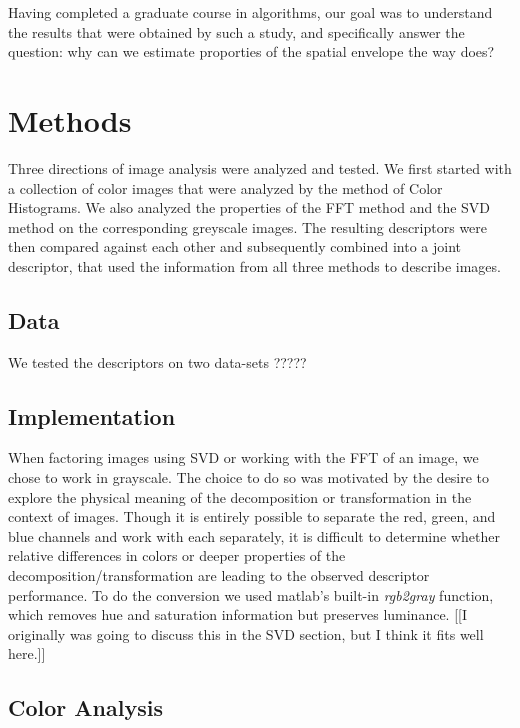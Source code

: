 \documentclass{report}
\begin{document}
Having completed a graduate course in algorithms, our goal was to understand the results that were obtained by such a study, and specifically answer the question: why can we estimate proporties of the spatial envelope the way \cite{gist_descriptor} does? 


\chapter{Methods}
Three directions of image analysis were analyzed and tested. We first started with a collection of color images that were analyzed by the method of Color Histograms. We also analyzed the properties of the FFT method and the SVD method on the corresponding greyscale images. The resulting descriptors were then compared against each other and subsequently combined into a joint descriptor, that used the information from all three methods to describe images.

\section{Data}
We tested the descriptors on two data-sets ?????
\section{Implementation}

When factoring images using SVD or working with the FFT of an image, we chose to work in grayscale. The choice to do so was motivated by the desire to explore the physical meaning of the decomposition or transformation in the context of images. Though it is entirely possible to separate the red, green, and blue channels and work with each separately, it is difficult to determine whether relative differences in colors or deeper properties of the decomposition/transformation are leading to the observed descriptor performance. To do the conversion we used matlab's built-in \textit{rgb2gray} function, which removes hue and saturation information but preserves luminance. [[I originally was going to discuss this in the SVD section, but I think it fits well here.]]

\section{Color Analysis}
\end{document}
